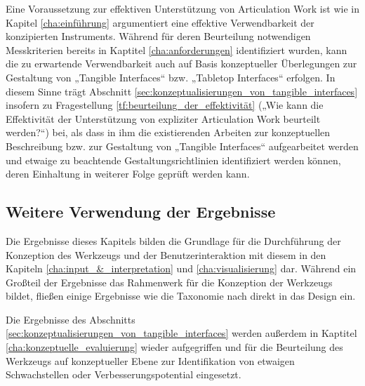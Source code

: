 Eine Voraussetzung zur effektiven Unterstützung von Articulation Work ist wie in Kapitel \ref{cha:einführung} argumentiert eine effektive Verwendbarkeit der konzipierten Instruments. Während für deren Beurteilung notwendigen Messkriterien bereits in Kaptitel \ref{cha:anforderungen} identifiziert wurden, kann die zu erwartende Verwendbarkeit auch auf Basis konzeptueller Überlegungen zur Gestaltung von „Tangible Interfaces“  bzw. „Tabletop Interfaces“ erfolgen. In diesem Sinne trägt Abschnitt \ref{sec:konzeptualisierungen_von_tangible_interfaces} insofern zu Fragestellung \ref{tf:beurteilung_der_effektivität} („Wie kann die Effektivität der Unterstützung von expliziter Articulation Work beurteilt werden?“) bei, als dass in ihm die existierenden Arbeiten zur konzeptuellen Beschreibung bzw. zur Gestaltung von „Tangible Interfaces“ aufgearbeitet werden und etwaige zu beachtende Gestaltungsrichtlinien identifiziert werden können, deren Einhaltung in weiterer Folge geprüft werden kann.

\subsection{Weitere Verwendung der Ergebnisse}

Die Ergebnisse dieses Kapitels bilden die Grundlage für die Durchführung der Konzeption des Werkzeugs und der Benutzerinteraktion mit diesem in den Kapiteln \ref{cha:input_&_interpretation} und \ref{cha:visualisierung} dar. Während ein Großteil der Ergebnisse das Rahmenwerk für die Konzeption der Werkzeugs bildet, fließen einige Ergebnisse wie die Taxonomie nach \citet{Fishkin04} direkt in das Design ein.

Die Ergebnisse des Abschnitts \ref{sec:konzeptualisierungen_von_tangible_interfaces} werden außerdem in Kaptitel \ref{cha:konzeptuelle_evaluierung} wieder aufgegriffen und für die Beurteilung des Werkzeugs auf konzeptueller Ebene zur Identifikation von etwaigen Schwachstellen oder Verbesserungspotential eingesetzt.



